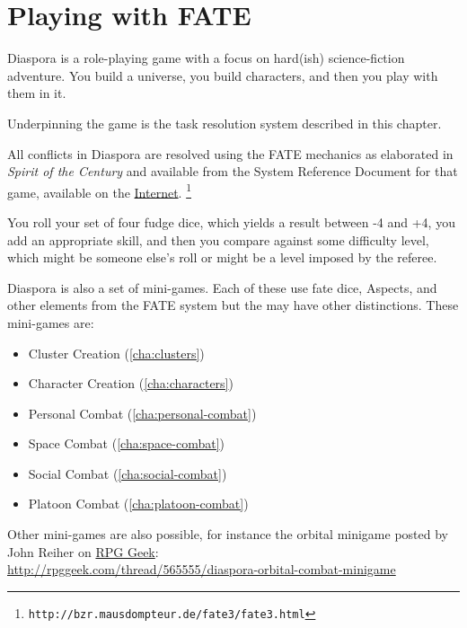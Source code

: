 \chapter{Playing with FATE}
\label{cha:playing-with-fate}

Diaspora is a role-playing game with a focus on hard(ish) science-fiction adventure. You build a universe, you build characters, and then you play with them in it.

Underpinning the game is the task resolution system described in this chapter.



All conflicts in Diaspora are resolved using the FATE mechanics as elaborated in \emph{Spirit of the Century} and available from the System Reference Document for that game, available on the \href{http://bzr.mausdompteur.de/fate3/fate3.html}{Internet}.%
\footnote{ \texttt{http://bzr.mausdompteur.de/fate3/fate3.html} }

You roll your set of four fudge dice, which yields a result between -4 and +4, you add an appropriate skill, and then you compare against some difficulty level, which might be someone else's roll or might be a level imposed by the referee.

Diaspora is also a set of mini-games. Each of these use fate dice, Aspects, and other elements from the FATE system but the may have other distinctions.  These mini-games are:


\begin{itemize}
\item Cluster Creation (\autoref{cha:clusters})
\item Character Creation (\autoref{cha:characters})
\item Personal Combat (\autoref{cha:personal-combat})
\item Space Combat (\autoref{cha:space-combat})
\item Social Combat (\autoref{cha:social-combat})
\item Platoon Combat (\autoref{cha:platoon-combat})
\end{itemize}

Other mini-games are also possible, for instance the orbital minigame posted
by John Reiher on \href{http://rpggeek.com/}{RPG Geek}: \\
\url{http://rpggeek.com/thread/565555/diaspora-orbital-combat-minigame}


% 

% 


% 


